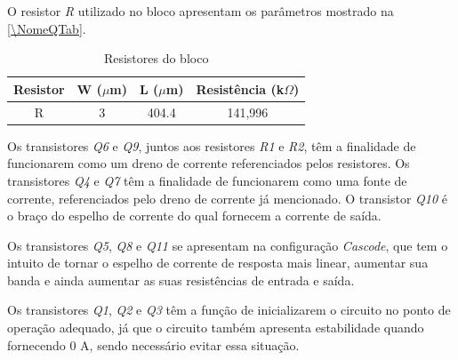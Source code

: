 O resistor \emph{R} utilizado no bloco \NomeBloco{} apresentam os par\^ametros mostrado na \autoref{\NomeQTab}.

\begin{table}[htbp]
\caption{Resistores do bloco \NomeBloco}
\label{\NomeQTab}
\centering
\begin{tabular}{cccc}
\toprule
Resistor & W ($\mu$m)  & L ($\mu$m) & Resist\^encia (k$\Omega$)\\
\midrule \midrule
R & 3 & 404.4 & 141,996\\
\bottomrule
\end{tabular}
\end{table}

Os transistores \emph{Q6} e \emph{Q9}, juntos aos resistores \emph{R1} e \emph{R2}, t\^em a finalidade de funcionarem como um dreno de corrente referenciados pelos resistores. Os transistores \emph{Q4} e \emph{Q7} t\^em a finalidade de funcionarem como uma fonte de corrente, referenciados pelo dreno de corrente j\'a mencionado. O transistor \emph{Q10} \'e o bra{\c c}o do espelho de corrente do qual fornecem a corrente de sa\'ida.

Os transistores \emph{Q5}, \emph{Q8} e \emph{Q11} se apresentam na configura{\c c}\~ao \emph{Cascode}, que tem o intuito de tornar o espelho de corrente de resposta mais linear, aumentar sua banda e ainda aumentar as suas resist\^encias de entrada e sa\'ida.

Os transistores \emph{Q1}, \emph{Q2} e \emph{Q3} t\^em a fun{\c c}\~ao de inicializarem o circuito no ponto de opera{\c c}\~ao adequado, j\'a que o circuito tamb\'em apresenta estabilidade quando fornecendo 0 A, sendo necess\'ario evitar essa situa{\c c}\~ao.